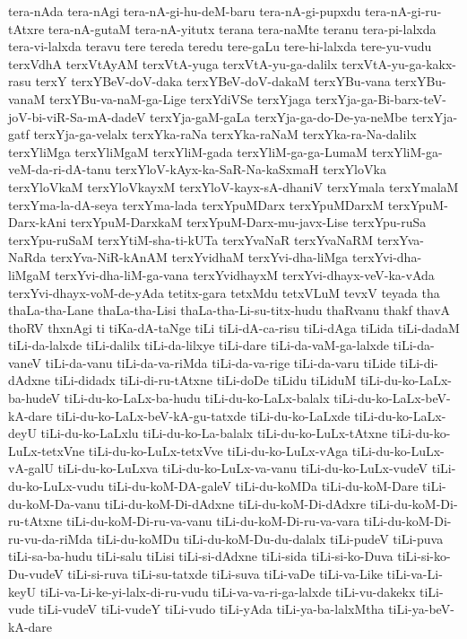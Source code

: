 {tera-nAda
tera-nAgi
tera-nA-gi-hu-deM-baru
tera-nA-gi-pupxdu
tera-nA-gi-ru-tAtxre
tera-nA-gutaM
tera-nA-yitutx
terana
tera-naMte
teranu
tera-pi-lalxda
tera-vi-lalxda
teravu
tere
tereda
teredu
tere-gaLu
tere-hi-lalxda
tere-yu-vudu
terxVdhA
terxVtAyAM
terxVtA-yuga
terxVtA-yu-ga-dalilx
terxVtA-yu-ga-kakx-rasu
terxY
terxYBeV-doV-daka
terxYBeV-doV-dakaM
terxYBu-vana
terxYBu-vanaM
terxYBu-va-naM-ga-Lige
terxYdiVSe
terxYjaga
terxYja-ga-Bi-barx-teV-joV-bi-viR-Sa-mA-dadeV
terxYja-gaM-gaLa
terxYja-ga-do-De-ya-neMbe
terxYja-gatf
terxYja-ga-velalx
terxYka-raNa
terxYka-raNaM
terxYka-ra-Na-dalilx
terxYliMga
terxYliMgaM
terxYliM-gada
terxYliM-ga-ga-LumaM
terxYliM-ga-veM-da-ri-dA-tanu
terxYloV-kAyx-ka-SaR-Na-kaSxmaH
terxYloVka
terxYloVkaM
terxYloVkayxM
terxYloV-kayx-sA-dhaniV
terxYmala
terxYmalaM
terxYma-la-dA-seya
terxYma-lada
terxYpuMDarx
terxYpuMDarxM
terxYpuM-Darx-kAni
terxYpuM-DarxkaM
terxYpuM-Darx-mu-javx-Lise
terxYpu-ruSa
terxYpu-ruSaM
terxYtiM-sha-ti-kUTa
terxYvaNaR
terxYvaNaRM
terxYva-NaRda
terxYva-NiR-kAnAM
terxYvidhaM
terxYvi-dha-liMga
terxYvi-dha-liMgaM
terxYvi-dha-liM-ga-vana
terxYvidhayxM
terxYvi-dhayx-veV-ka-vAda
terxYvi-dhayx-voM-de-yAda
tetitx-gara
tetxMdu
tetxVLuM
tevxV
teyada
tha
thaLa-tha-Lane
thaLa-tha-Lisi
thaLa-tha-Li-su-titx-hudu
thaRvanu
thakf
thavA
thoRV
thxnAgi
ti
tiKa-dA-taNge
tiLi
tiLi-dA-ca-risu
tiLi-dAga
tiLida
tiLi-dadaM
tiLi-da-lalxde
tiLi-dalilx
tiLi-da-lilxye
tiLi-dare
tiLi-da-vaM-ga-lalxde
tiLi-da-vaneV
tiLi-da-vanu
tiLi-da-va-riMda
tiLi-da-va-rige
tiLi-da-varu
tiLide
tiLi-di-dAdxne
tiLi-didadx
tiLi-di-ru-tAtxne
tiLi-doDe
tiLidu
tiLiduM
tiLi-du-ko-LaLx-ba-hudeV
tiLi-du-ko-LaLx-ba-hudu
tiLi-du-ko-LaLx-balalx
tiLi-du-ko-LaLx-beV-kA-dare
tiLi-du-ko-LaLx-beV-kA-gu-tatxde
tiLi-du-ko-LaLxde
tiLi-du-ko-LaLx-deyU
tiLi-du-ko-LaLxlu
tiLi-du-ko-La-balalx
tiLi-du-ko-LuLx-tAtxne
tiLi-du-ko-LuLx-tetxVne
tiLi-du-ko-LuLx-tetxVve
tiLi-du-ko-LuLx-vAga
tiLi-du-ko-LuLx-vA-galU
tiLi-du-ko-LuLxva
tiLi-du-ko-LuLx-va-vanu
tiLi-du-ko-LuLx-vudeV
tiLi-du-ko-LuLx-vudu
tiLi-du-koM-DA-galeV
tiLi-du-koMDa
tiLi-du-koM-Dare
tiLi-du-koM-Da-vanu
tiLi-du-koM-Di-dAdxne
tiLi-du-koM-Di-dAdxre
tiLi-du-koM-Di-ru-tAtxne
tiLi-du-koM-Di-ru-va-vanu
tiLi-du-koM-Di-ru-va-vara
tiLi-du-koM-Di-ru-vu-da-riMda
tiLi-du-koMDu
tiLi-du-koM-Du-du-dalalx
tiLi-pudeV
tiLi-puva
tiLi-sa-ba-hudu
tiLi-salu
tiLisi
tiLi-si-dAdxne
tiLi-sida
tiLi-si-ko-Duva
tiLi-si-ko-Du-vudeV
tiLi-si-ruva
tiLi-su-tatxde
tiLi-suva
tiLi-vaDe
tiLi-va-Like
tiLi-va-Li-keyU
tiLi-va-Li-ke-yi-lalx-di-ru-vudu
tiLi-va-va-ri-ga-lalxde
tiLi-vu-dakekx
tiLi-vude
tiLi-vudeV
tiLi-vudeY
tiLi-vudo
tiLi-yAda
tiLi-ya-ba-lalxMtha
tiLi-ya-beV-kA-dare
}
